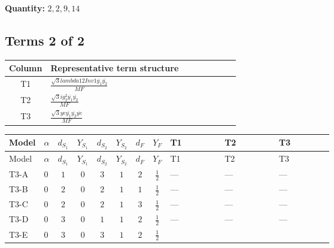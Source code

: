 \documentclass[8pt]{article}
\begin{document}
\begin{landscape}
\begin{longtable}{@{}llcccccc >{\raggedright\arraybackslash}p{0.21\linewidth} >{\raggedright\arraybackslash}p{0.21\linewidth} >{\raggedright\arraybackslash}p{0.21\linewidth}@{}}
\midrule
\bottomrule
\end{longtable}
\clearpage
\noindent\textbf{Quantity: }$\mathrm{2,2,9,14}$\par\smallskip
\subsection*{Terms 2 of 2}
\begin{center}
\begin{tabular}{@{}c >{\raggedright\arraybackslash}p{0.82\linewidth}@{}}
\toprule
Column & Representative term structure \\
\midrule
T1 & \(\displaystyle \frac{\sqrt{3} lambda12Inv1 \overline{y_{1}} \overline{y_{2}}}{MF}\) \\
\midrule
T2 & \(\displaystyle \frac{\sqrt{3} i g_{2}^{2} \overline{y_{1}} \overline{y_{2}}}{MF}\) \\
\midrule
T3 & \(\displaystyle \frac{\sqrt{3} ye \overline{y_{1}} \overline{y_{2}} \overline{ye}}{MF}\) \\
\midrule
\bottomrule
\end{tabular}
\end{center}
\smallskip
\tiny
\begin{longtable}{@{}llcccccc >{\raggedright\arraybackslash}p{0.21\linewidth} >{\raggedright\arraybackslash}p{0.21\linewidth} >{\raggedright\arraybackslash}p{0.21\linewidth}@{}}
\toprule
Model & $\alpha$ & $d_{S_1}$ & $Y_{S_1}$ & $d_{S_2}$ & $Y_{S_2}$ & $d_F$ & $Y_F$ & T1 & T2 & T3 \\
\midrule
\endfirsthead
\toprule
Model & $\alpha$ & $d_{S_1}$ & $Y_{S_1}$ & $d_{S_2}$ & $Y_{S_2}$ & $d_F$ & $Y_F$ & T1 & T2 & T3 \\
\midrule
\endhead
T3-A & $0$ & $1$ & $0$ & $3$ & $1$ & $2$ & $\frac{1}{2}$ & --- & --- & --- \\
\midrule
T3-B & $0$ & $2$ & $0$ & $2$ & $1$ & $1$ & $\frac{1}{2}$ & --- & --- & --- \\
\midrule
T3-C & $0$ & $2$ & $0$ & $2$ & $1$ & $3$ & $\frac{1}{2}$ & --- & --- & --- \\
\midrule
T3-D & $0$ & $3$ & $0$ & $1$ & $1$ & $2$ & $\frac{1}{2}$ & --- & --- & --- \\
\midrule
T3-E & $0$ & $3$ & $0$ & $3$ & $1$ & $2$ & $\frac{1}{2}$ & \scriptsize\adjustbox{max width=\linewidth}{$\begin{gathered} \frac{\sqrt{3} lambda12Inv1 \overline{y_{1}} \overline{y_{2}}}{6 MF}\end{gathered}$} & \scriptsize\adjustbox{max width=\linewidth}{$\begin{gathered} - \frac{\sqrt{3} i g_{2}^{2} \overline{y_{1}} \overline{y_{2}}}{6 MF}\end{gathered}$} & \scriptsize\adjustbox{max width=\linewidth}{$\begin{gathered} \frac{\sqrt{3} ye \overline{y_{1}} \overline{y_{2}} \overline{ye}}{12 MF}\end{gathered}$} \\
\midrule
\bottomrule
\end{longtable}
\clearpage

\end{landscape}
\end{document}
